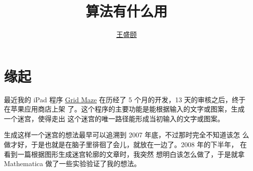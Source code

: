 \documentclass[cs4size,a4paper,adobefonts]{ctexart}
\begin{document}
\title{\bfseries 算法有什么用}
\author{\href{mailto:txyyss@gmail.com}{王盛颐}}
\date{}
\maketitle

\section*{缘起}
最近我的 iPad 程序
\href{http://itunes.apple.com/app/grid-maze/id553265800?mt=8}{Grid
  Maze} 在历经了 5 个月的开发，13 天的审核之后，终于在苹果应用商店上架
了。这个程序的主要功能是能根据输入的文字或图案，生成一个迷宫，使得走出
这个迷宫的唯一路径能形成当初输入的文字或图案。

生成这样一个迷宫的想法最早可以追溯到 2007 年底，不过那时完全不知道该怎
么做才好，于是也就是在脑子里徘徊了会儿，就放在一边了。2008 年的下半年，
在看到一篇根据图形生成迷宫轮廓的文章\cite{Xu:2007:ImageMaze}时，我突然
想明白该怎么做了，于是就拿 Mathematica 做了一些实验验证了我的想法。



\end{document}
